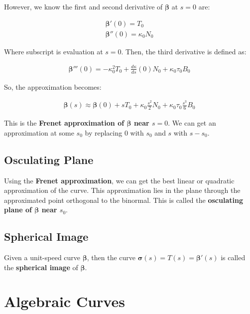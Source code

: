 \documentclass[11pt]{article}
\begin{document}
However, we know the first and second derivative of \(\boldsymbol{\beta}\) at \(s = 0\) are:

\begin{align*}
    \boldsymbol{\beta}'\left(0\right) = T_{0} \\
    \boldsymbol{\beta}''\left(0\right) = \kappa_{0}N_{0}
\end{align*}

Where subscript is evaluation at \(s = 0\). Then, the third derivative is defined as:

\begin{align*}
    \boldsymbol{\beta}'''\left(0\right) = -\kappa_{0}^{2}T_{0} + \frac{d\kappa}{ds}\left(0\right)N_{0} + \kappa_{0}\tau_{0}B_{0}
\end{align*}

So, the approximation becomes:

\begin{align*}
    \boldsymbol{\beta}\left(s\right) \approx \boldsymbol{\beta}\left(0\right) + sT_{0} + \kappa_{0}\frac{s^{2}}{2}N_{0} + \kappa_{0}\tau_{0}\frac{s^{3}}{6}B_{0}
\end{align*}

This is the \textbf{Frenet approximation of \(\boldsymbol{\beta}\) near \(s = 0\)}. We can get an approximation at some \(s_{0}\) by replacing \(0\) with \(s_{0}\) and \(s\) with \(s - s_{0}\).

\subsection{Osculating Plane}
\label{sec:org288e2c3}
Using the \textbf{Frenet approximation}, we can get the best linear or quadratic approximation of the curve. This approximation lies in the plane through the approximated point orthogonal to the binormal. This is called the \textbf{osculating plane of \(\boldsymbol{\beta}\) near \(s_{0}\)}.

\subsection{Spherical Image}
\label{sec:org94854c5}
Given a unit-speed curve \(\boldsymbol{\beta}\), then the curve \(\boldsymbol{\sigma}\left(s\right) = T\left(s\right) = \boldsymbol{\beta}'\left(s\right)\) is called the \textbf{spherical image} of \(\boldsymbol{\beta}\).

\section{Algebraic Curves}
\label{sec:org6a4d8eb}
\end{document}
